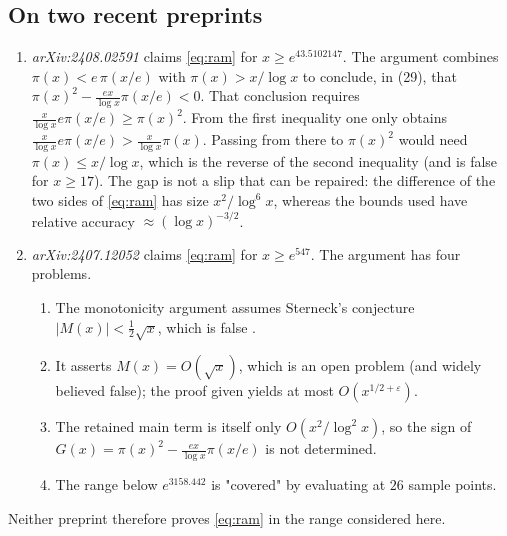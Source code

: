 \documentclass[11pt]{amsart}
\numberwithin{equation}{section}
\theoremstyle{definition}
\theoremstyle{remark}
\newcommand{\eps}{\varepsilon}
\begin{document}
\subsection{On two recent preprints}\label{sec:de}
\begin{enumerate}
\item \emph{arXiv:2408.02591} \cite{De2} claims \eqref{eq:ram} for $x \ge e^{43.5102147}$.
  The argument combines $\pi(x) < e\,\pi(x/e)$ with $\pi(x) > x/\log x$ to conclude, in (29), that $\pi(x)^2 - \frac{ex}{\log x}\pi(x/e) < 0$.
  That conclusion requires $\frac{x}{\log x}e\pi(x/e) \ge \pi(x)^2$.
  From the first inequality one only obtains $\frac{x}{\log x}e\pi(x/e) > \frac{x}{\log x}\pi(x)$.
  Passing from there to $\pi(x)^2$ would need $\pi(x) \le x/\log x$, which is the reverse of the second inequality (and is false for $x \ge 17$).
  The gap is not a slip that can be repaired: the difference of the two sides of \eqref{eq:ram} has size $x^2/\log^6x$, whereas the bounds used have relative accuracy $\approx(\log x)^{-3/2}$.
\item \emph{arXiv:2407.12052} \cite{De1} claims \eqref{eq:ram} for $x\ge e^{547}$.
  The argument has four problems.
  \begin{enumerate}
  \item The monotonicity argument assumes Sterneck's conjecture $|M(x)| < \frac12\sqrt x$, which is false \cite{Neubauer}.
  \item It asserts $M(x) = O(\sqrt x)$, which is an open problem (and widely believed false); the proof given yields at most $O(x^{1/2+\eps})$.
  \item The retained main term is itself only $O(x^2/\log^2x)$, so the sign of $G(x) = \pi(x)^2 - \frac{ex}{\log x}\pi(x/e)$ is not determined.
  \item The range below $e^{3158.442}$ is "covered" by evaluating at $26$ sample points.
  \end{enumerate}
\end{enumerate}
Neither preprint therefore proves \eqref{eq:ram} in the range considered here.
\end{document}
